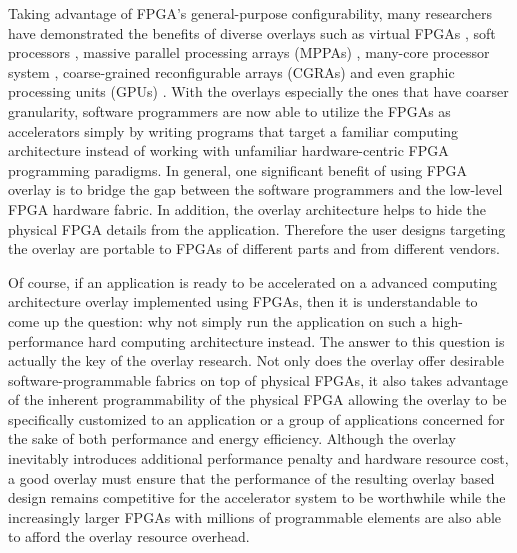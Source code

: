 Taking advantage of FPGA's general-purpose configurability, many researchers have demonstrated the benefits of diverse overlays such as virtual FPGAs \cite{brant2012ZUMA, grant2011malibu, coole2010intermediate}, soft processors \cite{nios, microblaze, guy2012VENICE}, massive parallel processing arrays (MPPAs) \cite{kissler2006dynamically, boppu2014compact, hannig2014invasive}, many-core processor system \cite{lebedev2010MARC}, coarse-grained reconfigurable arrays (CGRAs)\cite{lin2012energy, jain2015efficient, capalijia2013pipelined} and even graphic processing units (GPUs) \cite{al-dujaili2012Guppy}. With the overlays especially the ones that have coarser granularity, software programmers are now able to utilize the FPGAs as accelerators simply by writing programs that target a familiar computing architecture instead of working with unfamiliar hardware-centric FPGA programming paradigms. In general, one significant benefit of using FPGA overlay is to bridge the gap between the software programmers and the low-level FPGA hardware fabric. In addition, the overlay architecture helps to hide the physical FPGA details from the application. Therefore the user designs targeting the overlay are portable to FPGAs of different parts and from different vendors.

Of course, if an application is ready to be accelerated on a advanced computing architecture overlay implemented using FPGAs, then it is understandable to come up the question: why not simply run the application on such a high-performance hard computing architecture instead. The answer to this question is actually the key of the overlay research. Not only does the overlay offer desirable software-programmable fabrics on top of physical FPGAs, it also takes advantage of the inherent programmability of the physical FPGA allowing the overlay to be specifically customized to an application or a group of applications concerned for the sake of both performance and energy efficiency. Although the overlay inevitably introduces additional performance penalty and hardware resource cost, a good overlay must ensure that the performance of the resulting overlay based design remains competitive for the accelerator system to be worthwhile while the increasingly larger FPGAs with millions of programmable elements \cite{virtex-ultrascale} are also able to afford the overlay resource overhead.

